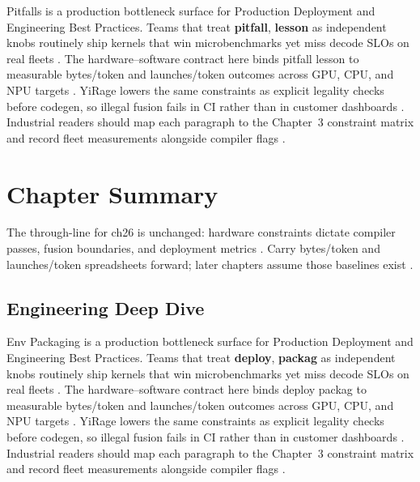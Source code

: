Pitfalls is a production bottleneck surface for Production Deployment and Engineering Best Practices. Teams that treat \textbf{pitfall}, \textbf{lesson} as independent knobs routinely ship kernels that win microbenchmarks yet miss decode SLOs on real fleets \citep{nvidia2022hopper,amd2024aie}. The hardware--software contract here binds pitfall lesson to measurable bytes/token and launches/token outcomes across GPU, CPU, and NPU targets \citep{semianalysis2024tma,dlbook}. YiRage lowers the same constraints as explicit legality checks before codegen, so illegal fusion fails in CI rather than in customer dashboards \citep{amd2024xdna,dao2022flashattention}. Industrial readers should map each paragraph to the Chapter~3 constraint matrix and record fleet measurements alongside compiler flags \citep{amd2024aie,kwon2023vllm}.

\section{Chapter Summary}
\label{sec:ch26_summary}

The through-line for ch26 is unchanged: hardware constraints dictate compiler passes, fusion boundaries, and deployment metrics \citep{memoryfloor2026,amd2024xdna}. Carry bytes/token and launches/token spreadsheets forward; later chapters assume those baselines exist \citep{semianalysis2024tma,dlbook}.


\subsection{Engineering Deep Dive}
\label{sec:ch26_deep_dive}

Env Packaging is a production bottleneck surface for Production Deployment and Engineering Best Practices. Teams that treat \textbf{deploy}, \textbf{packag} as independent knobs routinely ship kernels that win microbenchmarks yet miss decode SLOs on real fleets \citep{semianalysis2024tma,dlbook}. The hardware--software contract here binds deploy packag to measurable bytes/token and launches/token outcomes across GPU, CPU, and NPU targets \citep{amd2024xdna,dao2022flashattention}. YiRage lowers the same constraints as explicit legality checks before codegen, so illegal fusion fails in CI rather than in customer dashboards \citep{amd2024aie,kwon2023vllm}. Industrial readers should map each paragraph to the Chapter~3 constraint matrix and record fleet measurements alongside compiler flags \citep{dlbook,nvidia2024cudagraphs}.

